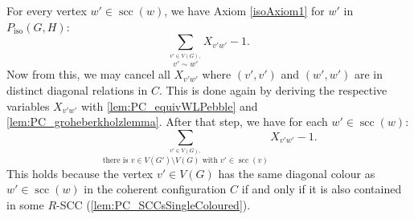 \documentclass[a4paper,UKenglish,cleveref, autoref, thm-restate]{lipics-v2021}
\newcommand{\scc}{{\operatorname{scc}}}
\newcommand{\Piso}{P_{\text{iso}}}
\begin{document}
	For every vertex $w' \in \scc(w)$, we have Axiom \eqref{isoAxiom1} for $w'$ in $\Piso(G,H)$:
	\[
	\sum_{\stackrel{v' \in V(G),}{ v' \sim w'}} X_{v'w'} - 1.
	\]
	Now from this, we may cancel all $X_{v'w'}$ where $(v',v')$ and $(w',w')$ are in distinct diagonal relations in $C$. This is done again by deriving the respective variables $X_{v'w'}$ with \autoref{lem:PC_equivWLPebble} and \autoref{lem:PC_groheberkholzlemma}. After that step, we have for each $w' \in \scc(w)$:
	\[
	\sum_{\stackrel{v' \in V(G),}{ \text{there is } v \in V(G') \setminus V(G) \text{ with } v' \in \scc(v) }} X_{v'w'} - 1.   \tag{$\star$}
	\]
	This holds because the vertex $v' \in V(G)$ has the same diagonal colour as $w' \in \scc(w)$ in the coherent configuration $C$ if and only if it is also contained in some $R$-SCC (\autoref{lem:PC_SCCsSingleColoured}).\\
	
\end{document}
